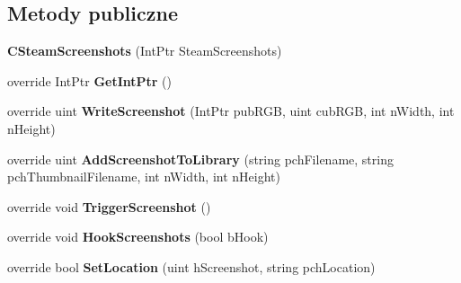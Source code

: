 \subsection*{Metody publiczne}
\begin{DoxyCompactItemize}
\item 
\mbox{\label{class_valve_1_1_steamworks_1_1_c_steam_screenshots_a47e9aedb5c84613210e5e6bfce0d8914}} 
{\bfseries C\+Steam\+Screenshots} (Int\+Ptr Steam\+Screenshots)
\item 
\mbox{\label{class_valve_1_1_steamworks_1_1_c_steam_screenshots_ab98e10425d223ea895a13e295e5208cc}} 
override Int\+Ptr {\bfseries Get\+Int\+Ptr} ()
\item 
\mbox{\label{class_valve_1_1_steamworks_1_1_c_steam_screenshots_a25bd500091551b277eff4d970d8e6ca8}} 
override uint {\bfseries Write\+Screenshot} (Int\+Ptr pub\+R\+GB, uint cub\+R\+GB, int n\+Width, int n\+Height)
\item 
\mbox{\label{class_valve_1_1_steamworks_1_1_c_steam_screenshots_ac5827ff6ef6766cb46ffb7c7e60ae03e}} 
override uint {\bfseries Add\+Screenshot\+To\+Library} (string pch\+Filename, string pch\+Thumbnail\+Filename, int n\+Width, int n\+Height)
\item 
\mbox{\label{class_valve_1_1_steamworks_1_1_c_steam_screenshots_ad7f3cedcc9cab74c49d63079ca397b73}} 
override void {\bfseries Trigger\+Screenshot} ()
\item 
\mbox{\label{class_valve_1_1_steamworks_1_1_c_steam_screenshots_ada01627e52205937ee4385d9c6a93b8b}} 
override void {\bfseries Hook\+Screenshots} (bool b\+Hook)
\item 
\mbox{\label{class_valve_1_1_steamworks_1_1_c_steam_screenshots_a1d7506436b59133a010615dc33d6dd0c}} 
override bool {\bfseries Set\+Location} (uint h\+Screenshot, string pch\+Location)
\item 
\mbox{\label{class_valve_1_1_steamworks_1_1_c_steam_screenshots_a424c5c68ffdf466f143fde81dc48f0d0}} 

\end{DoxyCompactItemize}
